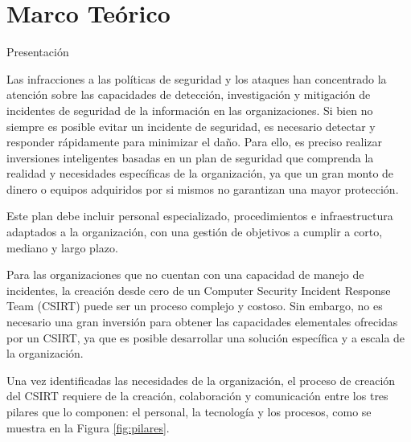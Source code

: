 \chapter{\Large Marco Teórico}
    \begin{section}{Presentación}
    
        Las infracciones a las políticas de seguridad y los ataques han concentrado la atención sobre las capacidades de detección, investigación y mitigación de incidentes de seguridad de la información en  las organizaciones. Si bien no siempre es posible evitar un incidente de seguridad, es necesario detectar y responder rápidamente para minimizar el daño. Para ello, es preciso realizar inversiones inteligentes basadas en un plan de seguridad que comprenda la realidad y necesidades específicas de la organización, ya que un gran monto de dinero o equipos adquiridos por si mismos no garantizan una mayor protección. \par
        Este plan debe incluir personal especializado, procedimientos e infraestructura  adaptados a la organización, con una gestión de objetivos a cumplir a corto, mediano y largo plazo. \par
        Para las organizaciones que no cuentan con una capacidad de manejo de incidentes, la creación desde cero de un Computer Security Incident Response Team (CSIRT) puede ser un proceso complejo y costoso. Sin embargo, no es necesario una gran inversión para obtener las capacidades elementales ofrecidas por un CSIRT, ya que es posible desarrollar una solución específica y a escala de la organización. \par
        Una vez identificadas las necesidades de la organización, el proceso de creación del CSIRT requiere de la creación, colaboración y comunicación entre los tres pilares que lo componen: el personal, la tecnología y los procesos, como se muestra en la Figura \ref{fig:pilares}. \par
        

\end{section}
